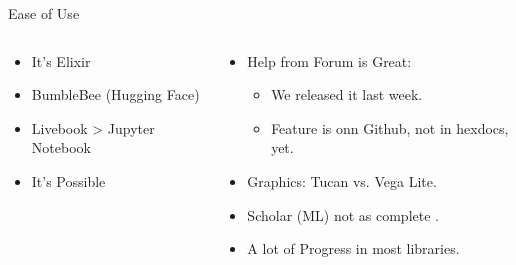 
\begin{frame}{Ease of Use}
	\begin{columns}
	\begin{column}{0.50\textwidth}
		\begin{tcolorbox}[enhanced jigsaw, colback=white, opacityback=.4, colframe=ElixirPurple, arc=3mm, boxrule=0mm, height=0.8\textheight, valign=center, title=The Good]

			
			\begin{itemize}
				\item It's Elixir
				\item BumbleBee (Hugging Face)
				\item Livebook > Jupyter Notebook
				\item It's Possible
				
			\end{itemize}

		\end{tcolorbox}
	\end{column}
	
	\begin{column}{0.6\textwidth}
		\begin{tcolorbox}[enhanced jigsaw, colback=white, opacityback=.4, colframe=ElixirPurple, arc=3mm, boxrule=0mm, height=0.8\textheight, valign=center, title=The Enhancing]
			
			\begin{itemize}
				\item Help from Forum is Great:
				\begin{itemize}
					\item We released it last week.
					\item Feature is onn Github, not in hexdocs, yet.
				\end{itemize}
				\item Graphics: Tucan vs. Vega Lite.
				\item Scholar (ML) not as complete .
				\item A lot of Progress in most libraries.
			\end{itemize}

		\end{tcolorbox}
	\end{column}
	\end{columns}
\end{frame}